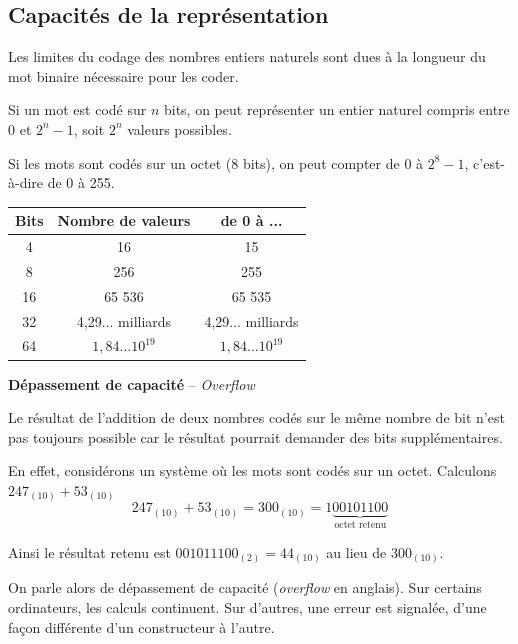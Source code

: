 \documentclass[10pt,fleqn]{article} %
\begin{document}
\subsection{Capacités de la représentation}

Les limites du codage des nombres entiers naturels sont dues à la longueur du mot binaire nécessaire pour les coder. 


\begin{resultat}
Si un mot est codé sur $n$ bits, on peut représenter un entier naturel compris entre 0 et $2^n-1$, soit $2^n$ valeurs possibles. 
\end{resultat}

\begin{exemple}
Si les mots sont codés sur un octet (8 bits), on peut compter de 0 à $2^8-1$, c'est-à-dire de 0 à 255. 

\begin{center}
\begin{tabular}{|c|c|c|}
\hline 
\textbf{Bits} & \textbf{Nombre de valeurs} & \textbf{de 0 à ...} \\\hline
4   & 16 & 15 \\ \hline
8   & 256 & 255 \\ \hline
16 & 65 536 & 65 535 \\ \hline
32 & 4,29... milliards &  4,29... milliards \\ \hline
64 & $1,84... 10^{19}$ & $1,84... 10^{19}$ \\ \hline

\end{tabular}
\end{center}
\end{exemple}

\begin{rem}
\textbf{Dépassement de capacité} -- \textit{Overflow}

Le résultat de l'addition de deux nombres codés sur le même nombre de bit n'est pas toujours possible car le résultat pourrait demander des bits supplémentaires. 

En effet, considérons un système où les mots sont codés sur un octet. Calculons $247_{(10)} + 53_{(10)}$
$$
247_{(10)} + 53_{(10)} = 300_{(10)} = 1\underbrace{00101100}_{\text{octet retenu}}
$$

Ainsi le résultat retenu est $001011100_{(2)}=44_{(10)}$ au lieu de $300_{(10)}$. 

On parle alors de dépassement de capacité (\textit{overflow} en anglais). Sur certains ordinateurs, les calculs continuent. Sur d’autres, une erreur est signalée, d’une façon différente d’un constructeur à l’autre.
\end{rem}
\end{document}

